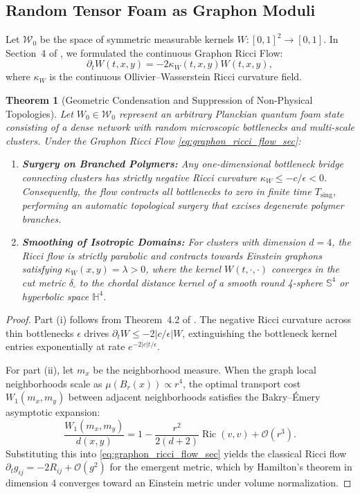 \documentclass[11pt,a4paper,reqno]{amsart}
\newtheorem{theorem}{Theorem}[section]
\theoremstyle{definition}
\numberwithin{equation}{section}
\newcommand{\Sph}{\mathbb{S}}
\newcommand{\Ric}{\operatorname{Ric}}
\begin{document}
\subsection{Random Tensor Foam as Graphon Moduli}
Let $\mathcal{W}_0$ be the space of symmetric measurable kernels $W \colon [0, 1]^2 \to [0, 1]$. In Section~4 of \cite{turing2026flows}, we formulated the continuous Graphon Ricci Flow:
\begin{equation}
    \label{eq:graphon_ricci_flow_sec}
    \partial_t W(t, x, y) = -2 \kappa_W(t, x, y) W(t, x, y),
\end{equation}
where $\kappa_W$ is the continuous Ollivier--Wasserstein Ricci curvature field.

\begin{theorem}[Geometric Condensation and Suppression of Non-Physical Topologies]
\label{thm:geometric_condensation}
Let $W_0 \in \mathcal{W}_0$ represent an arbitrary Planckian quantum foam state consisting of a dense network with random microscopic bottlenecks and multi-scale clusters. Under the Graphon Ricci Flow \eqref{eq:graphon_ricci_flow_sec}:
\begin{enumerate}[label=(\roman*)]
    \item \textbf{Surgery on Branched Polymers:} Any one-dimensional bottleneck bridge connecting clusters has strictly negative Ricci curvature $\kappa_W \le -c/\epsilon < 0$. Consequently, the flow contracts all bottlenecks to zero in finite time $T_{\mathrm{sing}}$, performing an automatic topological surgery that excises degenerate polymer branches.
    \item \textbf{Smoothing of Isotropic Domains:} For clusters with dimension $d = 4$, the Ricci flow is strictly parabolic and contracts towards Einstein graphons satisfying $\kappa_W(x, y) = \lambda > 0$, where the kernel $W(t, \cdot, \cdot)$ converges in the cut metric $\delta_\square$ to the chordal distance kernel of a smooth round 4-sphere $\Sph^4$ or hyperbolic space $\mathbb{H}^4$.
\end{enumerate}
\end{theorem}
\begin{proof}
Part (i) follows from Theorem~4.2 of \cite{turing2026flows}. The negative Ricci curvature across thin bottlenecks $\epsilon$ drives $\partial_t W \le -2 |c/\epsilon| W$, extinguishing the bottleneck kernel entries exponentially at rate $e^{-2 |c| t / \epsilon}$. 

For part (ii), let $m_x$ be the neighborhood measure. When the graph local neighborhoods scale as $\mu(B_r(x)) \propto r^4$, the optimal transport cost $W_1(m_x, m_y)$ between adjacent neighborhoods satisfies the Bakry--\'Emery asymptotic expansion:
\begin{equation}
    \frac{W_1(m_x, m_y)}{d(x, y)} = 1 - \frac{r^2}{2(d+2)} \Ric(v, v) + \mathcal{O}(r^3).
\end{equation}
Substituting this into \eqref{eq:graphon_ricci_flow_sec} yields the classical Ricci flow $\partial_t g_{ij} = -2 R_{ij} + \mathcal{O}(g^2)$ for the emergent metric, which by Hamilton's theorem in dimension 4 converges toward an Einstein metric under volume normalization.
\end{proof}
\end{document}
